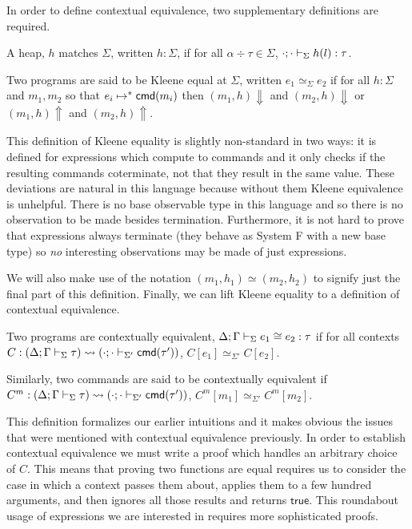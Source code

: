 In order to define contextual equivalence, two supplementary
definitions are required.
\begin{defn}\label{def:language:heapmatch}
  A heap, $h$ matches $\Sigma$, written $h : \Sigma$, if for all
  $\alpha \div \tau \in \Sigma$,
  $\cdot; \cdot \vdash_{\Sigma} h(l) \mathrel{:} \tau$.
\end{defn}
\begin{defn}\label{def:language:kleene}
  Two programs are said to be Kleene equal at $\Sigma$, written
  $e_1 \simeq_\Sigma e_2$ if for all $h : \Sigma$ and $m_1, m_2$ so
  that $e_i \mapsto^* \mathsf{cmd}(m_i)$ then $(m_1, h) \Downarrow$ and
  $(m_2, h) \Downarrow$ or $(m_1, h) \Uparrow$ and
  $(m_2, h) \Uparrow$.
\end{defn}
This definition of Kleene equality is slightly non-standard in two
ways: it is defined for expressions which compute to commands and it
only checks if the resulting commands coterminate, not that they
result in the same value. These deviations are natural in this
language because without them Kleene equivalence is unhelpful. There
is no base observable type in this language and so there is no
observation to be made besides termination. Furthermore, it is not
hard to prove that expressions always terminate (they behave as System
F with a new base type) so \emph{no} interesting observations may be
made of just expressions.

We will also make use of the notation $(m_1, h_1) \simeq (m_2, h_2)$
to signify just the final part of this definition. Finally, we can
lift Kleene equality to a definition of contextual equivalence.
\begin{defn}\label{def:language:cxt}
  Two programs are contextually equivalent,
  $\Delta; \Gamma \vdash_{\Sigma} e_1 \cong e_2 \mathrel{:} \tau$ if for all
  contexts
  $C : (\Delta; \Gamma \vdash_{\Sigma} \tau) \rightsquigarrow (\cdot; \cdot \vdash_{\Sigma'} \mathsf{cmd}(\tau'))$,
  $C[e_1] \simeq_{\Sigma'} C[e_2]$.

  Similarly, two commands are said to be contextually equivalent if
  $C^m : (\Delta; \Gamma \vdash_{\Sigma} \tau) \rightsquigarrow (\cdot; \cdot \vdash_{\Sigma'} \mathsf{cmd}(\tau'))$,
  $C^m[m_1] \simeq_{\Sigma'} C^m[m_2]$.
\end{defn}
This definition formalizes our earlier intuitions and it makes obvious
the issues that were mentioned with contextual equivalence previously.
In order to establish contextual equivalence we must write a proof
which handles an arbitrary choice of $C$. This means that proving two
functions are equal requires us to consider the case in which a
context passes them about, applies them to a few hundred arguments,
and then ignores all those results and returns $\mathsf{true}$. This
roundabout usage of expressions we are interested in requires more
sophisticated proofs.

